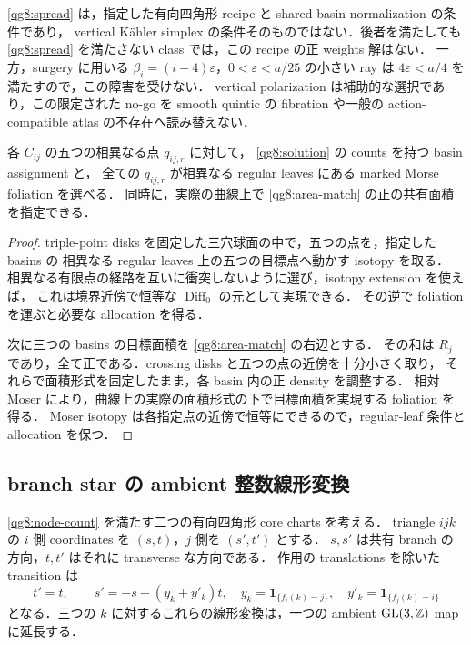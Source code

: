 \begin{remark}[追加条件の射程]\label{qg8:spread-scope}
\eqref{qg8:spread} は，指定した有向四角形 recipe と shared-basin normalization の条件であり，
vertical Kähler simplex の条件そのものではない．後者を満たしても
\eqref{qg8:spread} を満たさない class では，この recipe の正 weights 解はない．
一方，surgery に用いる $\beta_i=(i-4)\varepsilon$，$0<\varepsilon<a/25$ の小さい ray は
$4\varepsilon<a/4$ を満たすので，この障害を受けない．
vertical polarization は補助的な選択であり，この限定された no-go を
smooth quintic の fibration や一般の action-compatible atlas の不存在へ読み替えない．
\end{remark}

\begin{lemma}\label{qg8:marked-allocation}
各 $C_{ij}$ の五つの相異なる点 $q_{ij,r}$ に対して，
\eqref{qg8:solution} の counts を持つ basin assignment と，
全ての $q_{ij,r}$ が相異なる regular leaves にある marked Morse foliation を選べる．
同時に，実際の曲線上で \eqref{qg8:area-match} の正の共有面積を指定できる．
\end{lemma}

\begin{proof}
triple-point disks を固定した三穴球面の中で，五つの点を，指定した basins の
相異なる regular leaves 上の五つの目標点へ動かす isotopy を取る．
相異なる有限点の経路を互いに衝突しないように選び，isotopy extension を使えば，
これは境界近傍で恒等な $\operatorname{Diff}_0$ の元として実現できる．
その逆で foliation を運ぶと必要な allocation を得る．

次に三つの basins の目標面積を \eqref{qg8:area-match} の右辺とする．
その和は $R_j$ であり，全て正である．crossing disks と五つの点の近傍を十分小さく取り，
それらで面積形式を固定したまま，各 basin 内の正 density を調整する．
相対 Moser により，曲線上の実際の面積形式の下で目標面積を実現する foliation を得る．
Moser isotopy は各指定点の近傍で恒等にできるので，regular-leaf 条件と allocation を保つ．
\end{proof}

\subsection{branch star の ambient 整数線形変換}

\begin{proposition}\label{qg8:star-transition}
\eqref{qg8:node-count} を満たす二つの有向四角形 core charts を考える．
triangle $ijk$ の $i$ 側 coordinates を $(s,t)$，$j$ 側を $(s',t')$ とする．
$s,s'$ は共有 branch の方向，$t,t'$ はそれに transverse な方向である．
作用の translations を除いた transition は
\begin{equation}\label{qg8:face-transition}
 t'=t,\qquad s'=-s+(y_k+y'_k)t,
 \quad y_k=\mathbf1_{\{f_i(k)=j\}},\quad
 y'_k=\mathbf1_{\{f_j(k)=i\}}
\end{equation}
となる．三つの $k$ に対するこれらの線形変換は，一つの
ambient $\operatorname{GL}(3,\mathbb Z)$ map に延長する．
\end{proposition}

